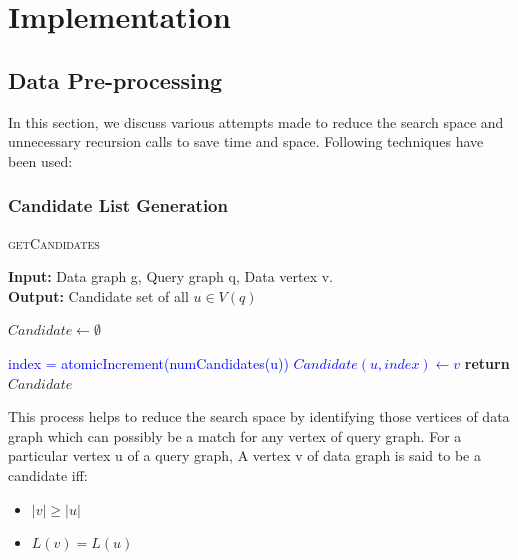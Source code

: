 \chapter{Implementation}
\label{chap:dpp}

\section{Data Pre-processing}
In this section, we discuss various attempts made to reduce the search space and unnecessary recursion calls to save time and space. Following techniques have been used:

\subsection{Candidate List Generation}

\begin{frame}{}
\begin{algorithm}
\caption{\textsc{getCandidates}}\label{euclid}

\textbf{Input:} Data graph g, Query graph q, Data vertex v.\\
\textbf{Output:} Candidate set of all $u \in V(q)$

\begin{algorithmic}[1]
\State $Candidate \gets \emptyset$\\
\Comment{\textcolor{green}{For all $v \in V(g)$, we launch a thread. Each thread performs the following operation}}

    \State \textcolor{blue}{index = atomicIncrement(numCandidates(u))}
    \State \textcolor{blue}{$Candidate(u, index) \gets v$}
\EndIf
\EndFor
\State \textbf{return} $Candidate$
\end{algorithmic}
\end{algorithm}
\end{frame}

This process helps to reduce the search space by identifying those vertices of data graph which can possibly be a match for any vertex of query graph. For a particular vertex u of a query graph, A vertex v of data graph is said to be a candidate iff:
\begin{itemize}
    \item $|v| \geq |u|$
    \item $L(v)=L(u)$
\end{itemize}

